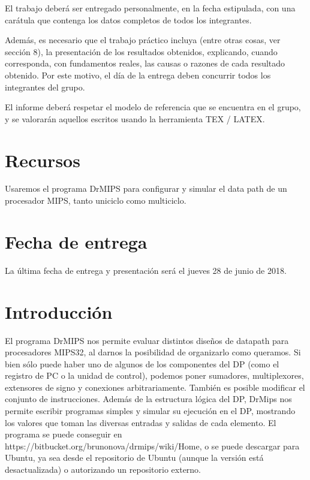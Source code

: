 \documentclass[11pt,a4paper, spanish]{article}
\begin{document}
El trabajo deberá ser entregado personalmente, en la fecha estipulada, con una carátula que contenga los datos completos de todos los integrantes.

Además, es necesario que el trabajo práctico incluya (entre otras cosas, ver sección 8), la presentación de los resultados obtenidos, explicando, cuando corresponda, con fundamentos reales, las causas o razones de cada resultado obtenido. Por este motivo, el día de la entrega deben concurrir todos los integrantes del grupo.

El informe deber\'a respetar el modelo de referencia que se encuentra en el grupo, y se valorar\'an aquellos escritos usando la herramienta TEX / LATEX.

\section{Recursos}

Usaremos el programa DrMIPS para configurar y simular el data path de un procesador MIPS, tanto uniciclo como multiciclo.

\section{Fecha de entrega}

La última fecha de entrega y presentación ser\'a el jueves 28 de junio de 2018.

\section{Introducción}\label{informe}
El programa DrMIPS nos permite evaluar distintos diseños de datapath para procesadores
MIPS32, al darnos la posibilidad de organizarlo como queramos. Si bien sólo puede haber uno
de algunos de los componentes del DP (como el registro de PC o la unidad de control), podemos
poner sumadores, multiplexores, extensores de signo y conexiones arbitrariamente. También es
posible modificar el conjunto de instrucciones. Además de la estructura lógica del DP, DrMips
nos permite escribir programas simples y simular su ejecución en el DP, mostrando los valores
que toman las diversas entradas y salidas de cada elemento. El programa se puede conseguir en
https://bitbucket.org/brunonova/drmips/wiki/Home, o se puede descargar para Ubuntu,
ya sea desde el repositorio de Ubuntu (aunque la versión está desactualizada) o autorizando un
repositorio externo.

\end{document}
